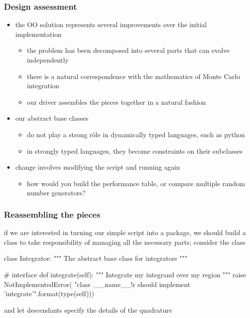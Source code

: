 %
%


\begin{frame}[fragile]
%
  \frametitle{Design assessment}
%
  \begin{itemize}
%
  \item the OO solution represents several improvements over the initial implementation
    \begin{itemize}
    \item the problem has been decomposed into several parts that can evolve independently
    \item there is a natural correspondence with the mathematics of Monte Carlo integration 
    \item our driver assembles the pieces together in a natural fashion
    \end{itemize}
%
  \item our abstract base classes
    \begin{itemize}
      \item do not play a strong r\^ole in dynamically typed languages, such as python
      \item in strongly typed languages, they become constraints on their subclasses
    \end{itemize}
%
  \item change involves modifying the script and running again
    \begin{itemize}
    \item how would you build the performance table, or compare multiple random number
      generators?
    \end{itemize}
%
  \end{itemize}
%
\end{frame}

\begin{frame}[fragile]
%
  \frametitle{Reassembling the pieces}
%
  if we are interested in turning our simple script into a package, we should build a class to
  take responsibility of managing all the necessary parts; consider the class
%
  \begin{ipython}{}
class Integrator:
    """
    The abstract base class for integrators
    """

    # interface
    def integrate(self):
        """
        Integrate my {integrand} over my {region}
        """
        raise NotImplementedError(
            "class {.__name__!r} should implement 'integrate'".format(type(self)))
  \end{ipython}
%
  and let descendants specify the details of the quadrature
%
\end{frame}

